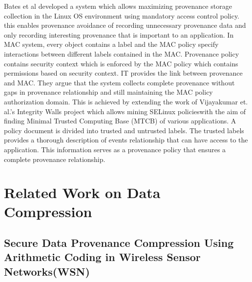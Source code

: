 Bates et al \cite{Bates:2015:TOY:2814579.2814586} developed a system which allows maximizing provenance storage collection in the Linux OS environment using mandatory access control policy. this enables provenance avoidance of recording unnecessary provenance data and only recording interesting provenance that is important to an application. In MAC system, every object contains a label and the MAC policy specify interactions between different labels contained in the MAC. Provenance policy contains security context which is enforced by the MAC policy which contains permissions based on security context. IT provides the link between provenance and MAC. They argue that the system collects complete provenance without gaps in provenance relationship and still maintaining the MAC policy authorization domain. This is achieved by extending the work of Vijayakumar et. al.’s \cite{asiaccs12-vijayakumar} Integrity Walls project which allows mining SELinux policieswith the aim of finding Minimal Trusted Computing Base (MTCB) of various applications. A policy document is divided into trusted and untrusted labels. The trusted labels provides a thorough description of events relationship that can have access to the application. This information serves as a provenance policy that ensures a complete provenance relationship.


\section{Related Work on Data Compression}

\subsection{Secure Data Provenance Compression Using Arithmetic Coding in Wireless Sensor Networks(WSN)}

